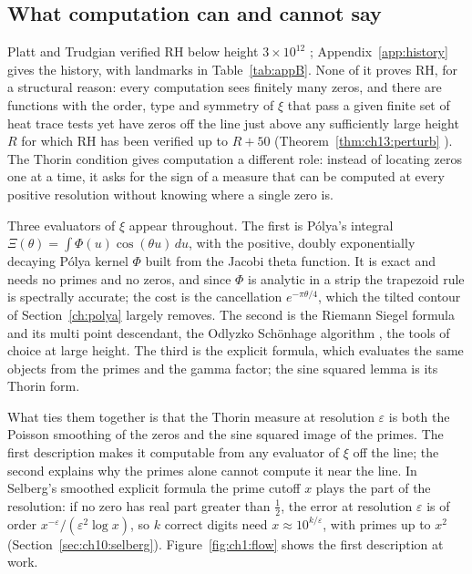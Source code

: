 \subsection{What computation can and cannot say}

Platt and Trudgian verified RH below height $3\times10^{12}$ \cite{PT21}; Appendix~\ref{app:history} gives the history, with landmarks in Table~\ref{tab:appB}. None of it proves RH, for a structural reason: every computation sees finitely many zeros, and there are functions with the order, type and symmetry of $\xi$ that pass a given finite set of heat trace tests yet have zeros off the line just above any sufficiently large height $R$ for which RH has been verified up to $R+50$ (Theorem~\ref{thm:ch13:perturb} \cite[Theorem D]{P17}). The Thorin condition gives computation a different role: instead of locating zeros one at a time, it asks for the sign of a measure that can be computed at every positive resolution without knowing where a single zero is.

Three evaluators of $\xi$ appear throughout. The first is P\'olya's integral $\Xi(\theta)=\int\Phi(u)\cos(\theta u)\,du$, with the positive, doubly exponentially decaying P\'olya kernel $\Phi$ built from the Jacobi theta function. It is exact and needs no primes and no zeros, and since $\Phi$ is analytic in a strip the trapezoid rule is spectrally accurate; the cost is the cancellation $e^{-\pi\theta/4}$, which the tilted contour of Section~\ref{ch:polya} largely removes. The second is the Riemann Siegel formula and its multi point descendant, the Odlyzko Sch\"onhage algorithm \cite{OS88}, the tools of choice at large height. The third is the explicit formula, which evaluates the same objects from the primes and the gamma factor; the sine squared lemma is its Thorin form.

What ties them together is that the Thorin measure at resolution $\varepsilon$ is both the Poisson smoothing of the zeros and the sine squared image of the primes. The first description makes it computable from any evaluator of $\xi$ off the line; the second explains why the primes alone cannot compute it near the line. In Selberg's smoothed explicit formula the prime cutoff $x$ plays the part of the resolution: if no zero has real part greater than $\frac12$, the error at resolution $\varepsilon$ is of order $x^{-\varepsilon}/(\varepsilon^2\log x)$, so $k$ correct digits need $x\approx10^{k/\varepsilon}$, with primes up to $x^2$ (Section~\ref{sec:ch10:selberg}). Figure~\ref{fig:ch1:flow} shows the first description at work.

